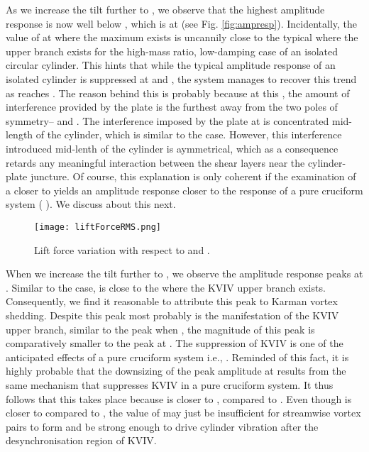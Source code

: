 \documentclass[a4paper]{article}
\begin{document}
As we increase the tilt further to \rtw{}, we observe that the highest amplitude response is now well below \ured{} \es{} \urni{}, which is at \ured{} \es{} \urth{} (see Fig. \ref{fig:ampresp}). Incidentally, the value of \urth{} at where the maximum \yrms{} exists is uncannily close to the typical \ured{} where the upper branch exists for the high-mass ratio, low-damping case of an isolated circular cylinder. This hints that while the typical amplitude response of an isolated cylinder is suppressed at \ptlt{} \rze{} and \ron{}, the system manages to recover this trend as \ptlt{} reaches \rth{}. The reason behind this is probably because at this \ptlt{}, the amount of interference provided by the plate is the furthest away from the two poles of symmetry--\ptlt{} \es{} \rze{} and \rfo{}. The interference imposed by the plate at \ptlt{} \es{} \rtw{} is concentrated mid-length of the cylinder, which is similar to the \ptlt{} \es{} \rfo{} case. However, this interference introduced mid-lenth of the cylinder is aymmetrical, which as a consequence retards any meaningful interaction between the shear layers near the cylinder-plate juncture. Of course, this explanation is only coherent if the examination of a \ptlt{} closer to \rfo{} yields an amplitude response closer to the response of a pure cruciform system (\ptlt{} \es{} \rfo{}). We discuss about this next.

\begin{figure}[h]
  \centering
  \texttt{[image: liftForceRMS.png]}
  \caption{Lift force variation with respect to \ured{} and \ptlt{}.}
  \label{fig:liftevo}
\end{figure}

When we increase the tilt further to \ptlt{} \es{} \rth{}, we observe the amplitude response peaks at \ured{} \es{} \urtw{}. Similar to the \rtw{} case, \ured{} \es{} \urtw{} is close to the \ured{} where the KVIV upper branch exists. Consequently, we find it reasonable to attribute this peak to Karman vortex shedding. Despite this peak most probably is the manifestation of the KVIV upper branch, similar to the peak when \ptlt{} \es{} \rtw{}, the magnitude of this peak is comparatively smaller to the peak at \rtw{}. The suppression of KVIV is one of the anticipated effects of a pure cruciform system i.e., \ptlt{} \es{} \rfo{} \parencite{Shirakashi1989}. Reminded of this fact, it is highly probable that the downsizing of the peak amplitude at \rth{} results from the same mechanism that suppresses KVIV in a pure cruciform system. It thus follows that this takes place because \ptlt{} \es{} \rth{} is closer to \rfo{}, compared to \rtw{}. Even though \ptlt{} \es{} \rth{} is closer to \rfo{} compared to \rtw{}, the value of \rth{} may just be insufficient for streamwise vortex pairs to form and be strong enough to drive cylinder vibration after the desynchronisation region of KVIV.
\end{document}
